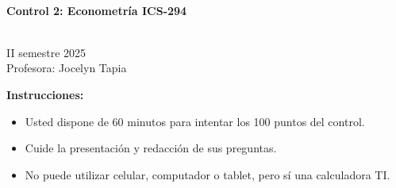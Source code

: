 \documentclass[10pt,a4paper]{article}
\begin{document}
\vspace{5cm}



\begin{center}
\begin{large}
\textbf{\\Control 2: Econometría ICS-294}
\end{large}\\
\vspace{0.2cm}
II semestre 2025\\
Profesora: Jocelyn Tapia\\
\end{center}

\textbf{Instrucciones:} 

\begin{itemize}

    \item Usted dispone de 60 minutos  para intentar los 100 puntos del control.
    \item Cuide la presentación y redacción de sus preguntas.
    \item No puede utilizar celular, computador o tablet, pero sí una calculadora TI.
     
\end{itemize}
\end{document}
